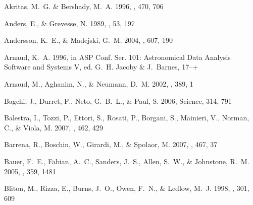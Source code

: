 \documentclass[apj]{emulateapj}
\begin{document}
\begin{thebibliography}{} %

{Akritas}, M.~G. \& {Bershady}, M.~A. 1996, \apj, 470, 706

{Anders}, E., \& {Grevesse}, N. 1989, \gca, 53, 197

{Andersson}, K.~E., \& {Madejski}, G.~M. 2004, \apj, 607, 190

{Arnaud}, K.~A. 1996, in ASP Conf. Ser. 101: Astronomical Data Analysis
  Software and Systems V, ed. G.~H. {Jacoby} \& J.~{Barnes}, 17--+

{Arnaud}, M., {Aghanim}, N., \& {Neumann}, D.~M. 2002, \aap, 389, 1

{Bagchi}, J., {Durret}, F., {Neto}, G.~B.~L., \& {Paul}, S. 2006, Science, 314,
  791

{Balestra}, I., {Tozzi}, P., {Ettori}, S., {Rosati}, P., {Borgani}, S.,
  {Mainieri}, V., {Norman}, C., \& {Viola}, M. 2007, \aap, 462, 429

{Barrena}, R., {Boschin}, W., {Girardi}, M., \& {Spolaor}, M. 2007, \aap, 467,
  37

{Bauer}, F.~E., {Fabian}, A.~C., {Sanders}, J.~S., {Allen}, S.~W., \&
  {Johnstone}, R.~M. 2005, \mnras, 359, 1481

{Bliton}, M., {Rizza}, E., {Burns}, J.~O., {Owen}, F.~N., \& {Ledlow}, M.~J.
  1998, \mnras, 301, 609


\end{thebibliography}
\end{document}
